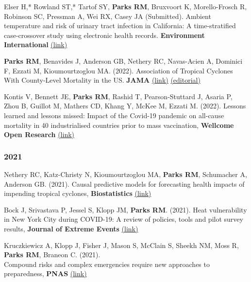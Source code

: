 \noindent Elser H,* Rowland ST,* Tartof SY, \textbf{Parks RM}, Bruxvoort K, Morello-Frosch R, Robinson SC, Pressman A, Wei RX, Casey JA (Submitted). Ambient temperature and risk of urinary tract infection in California: A time-stratified case-crossover study using electronic health records. \textbf{Environment International} \href{https://www.sciencedirect.com/science/article/pii/S0160412022002306}{(link)} \bigskip

\noindent \textbf{Parks RM}, Benavides J, Anderson GB, Nethery RC, Navas-Acien A, Dominici F, Ezzati M, Kioumourtzoglou MA. (2022). Association of Tropical Cyclones With County-Level Mortality in the US. \textbf{JAMA} \href{https://jamanetwork.com/journals/jama/fullarticle/2789661}{(link)} \href{https://jamanetwork.com/journals/jama/fullarticle/2789676}{(editorial)} \bigskip

\noindent Kontis V, Bennett JE, \textbf{Parks RM}, Rashid T, Pearson-Stuttard J, Asaria P, Zhou B, Guillot M, Mathers CD, Khang Y, McKee M, Ezzati M. (2022). Lessons learned and lessons missed: Impact of the Covid-19 pandemic on all-cause mortality in 40 industrialised countries prior to mass vaccination, \textbf{Wellcome Open Research} \href{https://wellcomeopenresearch.org/articles/6-279/v2}{(link)} %


\subsubsection*{2021}

\noindent Nethery RC, Katz-Christy N, Kioumourtzoglou MA, \textbf{Parks RM}, Schumacher A, Anderson GB. (2021). Causal predictive models for forecasting health impacts of impending tropical cyclones, \textbf{Biostatistics} \href{https://academic.oup.com/biostatistics/advance-article/doi/10.1093/biostatistics/kxab047/6485226?guestAccessKey=378fb8f6-102d-4b21-a93d-b0a01353c19f#}{(link)} \bigskip

\noindent Bock J, Srivastava P, Jessel S, Klopp JM, \textbf{Parks RM}. (2021). Heat vulnerability in New York City during COVID-19: A review of policies, tools and pilot survey results, \textbf{Journal of Extreme Events} \href{https://www.worldscientific.com/doi/10.1142/S2345737621500159}{(link)} \bigskip

\noindent Kruczkiewicz A, Klopp J, Fisher J, Mason S, McClain S, Sheekh NM, Moss R, \textbf{Parks RM}, Braneon C. (2021).\\Compound risks and complex emergencies require new approaches to preparedness, \textbf{PNAS} \href{https://www.pnas.org/content/118/19/e2106795118}{(link)} \bigskip

